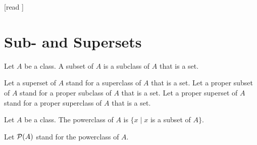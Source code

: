 \documentclass[10pt]{article}
\begin{document}
  \begin{imports}
    \begin{forthel}
      [read ]
    \end{forthel}
  \end{imports}


  \section*{Sub- and Supersets}

  \begin{forthel}
    \begin{definition}[id=FOUNDATIONS_10_1346889551183872,printid]
      Let $A$ be a class.
      A subset of $A$ is a subclass of $A$ that is a set.
    \end{definition}

    Let a superset of $A$ stand for a superclass of $A$ that is a set.
    Let a proper subset of $A$ stand for a proper subclass of $A$ that is a set.
    Let a proper superset of $A$ stand for a proper superclass of $A$ that is a set.
  \end{forthel}

  \begin{forthel}
    \begin{definition}[id=FOUNDATIONS_10_1448589907722240,printid]
      Let $A$ be a class.
      The powerclass of $A$ is $\{ x \mid x$ is a subset of $A \}$.
    \end{definition}

    Let $\mathcal{P}(A)$ stand for the powerclass of $A$.
  \end{forthel}
\end{document}
